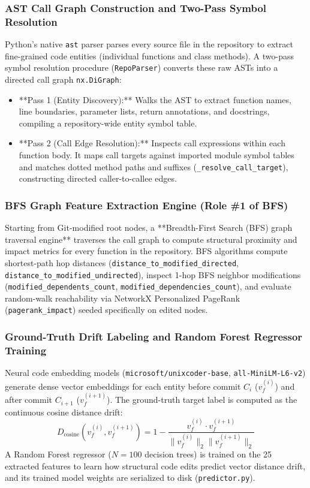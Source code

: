 \documentclass[conference]{IEEEtran}
\begin{document}
\subsubsection{AST Call Graph Construction and Two-Pass Symbol Resolution}
Python's native \texttt{ast} parser parses every source file in the repository to extract fine-grained code entities (individual functions and class methods). A two-pass symbol resolution procedure (\texttt{RepoParser}) converts these raw ASTs into a directed call graph \texttt{nx.DiGraph}:
\begin{itemize}
    \item **Pass 1 (Entity Discovery):** Walks the AST to extract function names, line boundaries, parameter lists, return annotations, and docstrings, compiling a repository-wide entity symbol table.
    \item **Pass 2 (Call Edge Resolution):** Inspects call expressions within each function body. It maps call targets against imported module symbol tables and matches dotted method paths and suffixes (\texttt{\_resolve\_call\_target}), constructing directed caller-to-callee edges.
\end{itemize}

\subsubsection{BFS Graph Feature Extraction Engine (Role \#1 of BFS)}
Starting from Git-modified root nodes, a **Breadth-First Search (BFS) graph traversal engine** traverses the call graph to compute structural proximity and impact metrics for every function in the repository. BFS algorithms compute shortest-path hop distances (\texttt{distance\_to\_modified\_directed}, \texttt{distance\_to\_modified\_undirected}), inspect 1-hop BFS neighbor modifications (\texttt{modified\_dependents\_count}, \texttt{modified\_dependencies\_count}), and evaluate random-walk reachability via NetworkX Personalized PageRank (\texttt{pagerank\_impact}) seeded specifically on edited nodes.

\subsubsection{Ground-Truth Drift Labeling and Random Forest Regressor Training}
Neural code embedding models (\texttt{microsoft/unixcoder-base}, \texttt{all-MiniLM-L6-v2}) generate dense vector embeddings for each entity before commit $C_i$ ($v_f^{(i)}$) and after commit $C_{i+1}$ ($v_f^{(i+1)}$). The ground-truth target label is computed as the continuous cosine distance drift:
\begin{equation}
D_{\text{cosine}}(v_f^{(i)}, v_f^{(i+1)}) = 1 - \frac{v_f^{(i)} \cdot v_f^{(i+1)}}{\|v_f^{(i)}\|_2 \|v_f^{(i+1)}\|_2}
\end{equation}
A Random Forest regressor ($N=100$ decision trees) is trained on the 25 extracted features to learn how structural code edits predict vector distance drift, and its trained model weights are serialized to disk (\texttt{predictor.py}).
\end{document}
